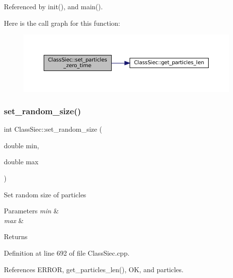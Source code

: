 Referenced by init(), and main().

Here is the call graph for this function\+:
\nopagebreak
\begin{figure}[H]
\begin{center}
\leavevmode
\includegraphics[width=350pt]{classClassSiec_a37811fccdbeb4119061a02cfb9386677_cgraph}
\end{center}
\end{figure}
\mbox{\label{classClassSiec_a4b63c475330f7b0c96a244f55a624fac}} 
\subsubsection{\texorpdfstring{set\+\_\+random\+\_\+size()}{set\_random\_size()}}
{\footnotesize\ttfamily int Class\+Siec\+::set\+\_\+random\+\_\+size (\begin{DoxyParamCaption}\item[{double}]{min,  }\item[{double}]{max }\end{DoxyParamCaption})}

Set random size of particles 
\begin{DoxyParams}{Parameters}
{\em min} & \\
\hline
{\em max} & \\
\hline
\end{DoxyParams}
\begin{DoxyReturn}{Returns}

\end{DoxyReturn}


Definition at line 692 of file Class\+Siec.\+cpp.



References E\+R\+R\+OR, get\+\_\+particles\+\_\+len(), OK, and particles.

